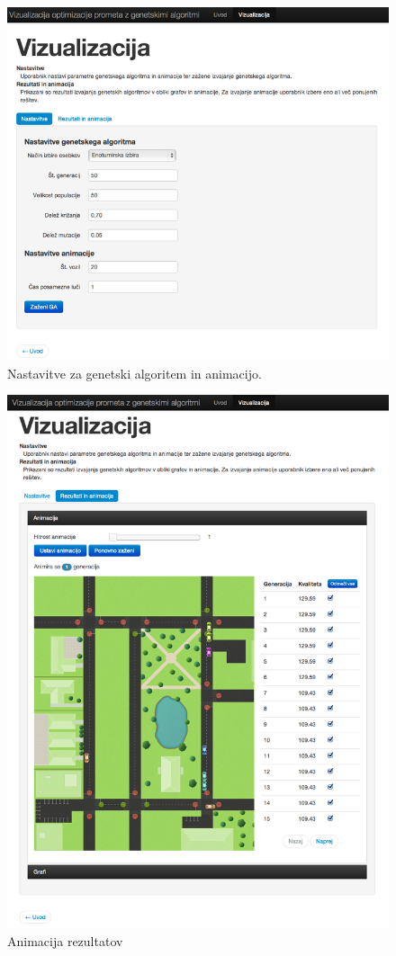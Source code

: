 \documentclass[a4paper, 12pt]{book}
\begin{document}
\begin{figure}
\includegraphics[scale=0.50]{nastavitev_parametrov.png}
\caption{Nastavitve za genetski algoritem in animacijo.}
\label{fig:vizualizacija-nastavitev parametrov}
\end{figure}

\begin{figure}
\centering
\includegraphics[scale=0.50]{rezultati.png}
\caption{Animacija rezultatov}
\label{fig:vizualizacija-rezultati}
\end{figure}
\end{document}

